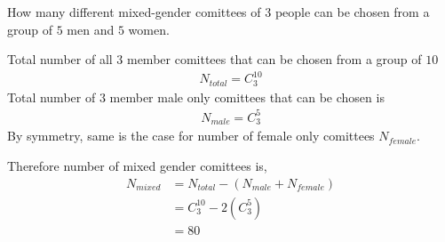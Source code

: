 
%
%
%
%
% 
% 

\question[4] How many different mixed-gender comittees of 3 people can be chosen from a group of $5$ men and $5$ women.


\ifprintanswers
\fi 

\begin{solution}[\halfpage]
  Total number of all $3$ member comittees that can be chosen from a group of $10$
  \begin{align}
    N_{total} = C^{10}_3 \nonumber
  \end{align}
  Total number of $3$ member male only comittees that can be chosen is
  \begin{align}
    N_{male} = C^{5}_3 \nonumber
  \end{align}
  By symmetry, same is the case for number of female only comittees $N_{female}$.
  
  Therefore number of mixed gender comittees is,
  \begin{align}
    N_{mixed} &= N_{total} - (N_{male}+N_{female}) \nonumber \\
              &= C^{10}_3 - 2(C^5_3) \nonumber \\
              &= 80 \nonumber
  \end{align}
\end{solution}

